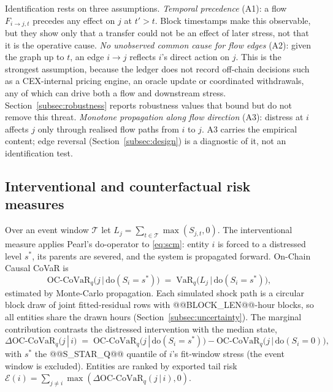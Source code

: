\documentclass[referee,pdflatex,sn-mathphys-ay]{sn-jnl}
\theoremstyle{thmstyleone}%
\theoremstyle{thmstyletwo}%
\theoremstyle{thmstylethree}%
\newcommand{\doop}{\mathrm{do}}
\newcommand{\VaR}{\mathrm{VaR}}
\newcommand{\OCCoVaR}{\text{OC-CoVaR}}
\begin{document}
Identification rests on three assumptions. \emph{Temporal precedence} (A1): a flow
$F_{i\to j,t}$ precedes any effect on $j$ at $t'>t$. Block timestamps make this
observable, but they show only that a transfer could not be an effect of later stress, not
that it is the operative cause. \emph{No unobserved common cause for flow edges} (A2): given
the graph up to $t$, an edge $i\to j$ reflects $i$'s direct action on $j$. This is the
strongest assumption, because the ledger does not record off-chain decisions such as a
CEX-internal pricing engine, an oracle update or coordinated withdrawals, any of which can
drive both a flow and downstream stress. Section~\ref{subsec:robustness} reports robustness values that
bound but do not remove this threat. \emph{Monotone propagation along flow direction} (A3): distress
at $i$ affects $j$ only through realised flow paths from $i$ to $j$. A3 carries the
empirical content; edge reversal (Section~\ref{subsec:design}) is a diagnostic of it, not an identification test.

\subsection{Interventional and counterfactual risk measures}
\label{subsec:risk}
Over an event window $\mathcal{T}$ let $L_j=\sum_{t\in\mathcal{T}}\max(S_{j,t},0)$. The
interventional measure applies Pearl's do-operator to \eqref{eq:scm}: entity $i$ is forced
to a distressed level $s^\ast$, its parents are severed, and the system is propagated
forward. On-Chain Causal CoVaR is
\begin{equation}
\label{eq:occovar}
\OCCoVaR_q\big(j \,\big|\, \doop(S_i=s^\ast)\big)
   \;=\; \VaR_q\!\Big(L_j \,\Big|\, \doop(S_i=s^\ast)\Big),
\end{equation}
estimated by Monte-Carlo propagation. Each simulated shock path is a circular block draw of joint fitted-residual rows
with @@BLOCK_LEN@@-hour blocks, so all entities share the drawn hours (Section~\ref{subsec:uncertainty}). The marginal
contribution contrasts the distressed intervention with the median state,
\begin{equation}
\label{eq:deltaoccovar}
\Delta\OCCoVaR_q(j\,|\,i) \;=\;
\OCCoVaR_q\big(j\,|\,\doop(S_i=s^\ast)\big) -
\OCCoVaR_q\big(j\,|\,\doop(S_i=0)\big),
\end{equation}
with $s^\ast$ the @@S_STAR_Q@@ quantile of $i$'s fit-window stress (the event window is excluded).
Entities are ranked by exported tail
risk $\mathcal{E}(i)=\sum_{j\ne i}\max(\Delta\OCCoVaR_q(j\,|\,i),0)$.
\end{document}
